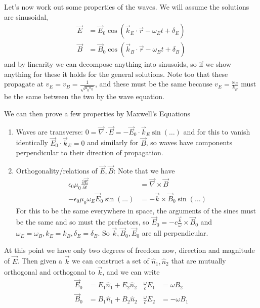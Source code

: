 \documentclass[10pt]{report}
\newcommand{\pd}[2]{\frac{\partial #1}{\partial#2}}
\begin{document}
Let's now work out some properties of the waves. We will assume the solutions are sinusoidal, 
\begin{align}
    \vec{E} &= \vec{E}_0 \cos\left( \vec{k}_E \cdot \vec{r} - \omega_Et + \delta_E \right)\\
    \vec{B} &= \vec{B}_0 \cos\left( \vec{k}_B \cdot \vec{r} - \omega_Bt + \delta_B \right)
\end{align}
and by linearity we can decompose anything into sinusoids, so if we show anything for these it holds for the general solutions. Note too that these propagate at $v_E = v_B = \frac{1}{\sqrt{\mu_0 \epsilon_0}}$, and these must be the same because $v_E = \frac{\omega_E}{k_E}$ must be the same between the two by the wave equation. 

We can then prove a few properties by Maxwell's Equations
\begin{enumerate}
    \item Waves are transverse: $0 = \vec{\nabla} \cdot \vec{E} = -\vec{E}_0 \cdot \vec{k}_E \sin (\dots)$ and for this to vanish identically $\vec{E}_0 \cdot \vec{k}_E = 0$ and similarly for $\vec{B}$, so waves have components perpendicular to their direction of propagation.
    \item Orthogonality/relations of $\vec{E}, \vec{B}$: Note that we have
        \begin{align}
            \epsilon_0 \mu_0 \pd{\vec{E}}{t} &= \vec{\nabla} \times \vec{B}\\
            -\epsilon_0 \mu_0 \omega_E \vec{E}_0 \sin \left( \dots \right) &= -\vec{k}\times \vec{B}_0 \sin(\dots)
        \end{align}
        For this to be the same everywhere in space, the arguments of the sines must be the same and so must the prefactors, so $\vec{E}_0 = -c \frac{\vec{k}}{\omega} \times \vec{B}_0$ and $\omega_E = \omega_B, k_E = k_B, \delta_E = \delta_B$. So $\vec{k}, \vec{B}_0, \vec{E}_0$ are all perpendicular.
\end{enumerate}

At this point we have only two degrees of freedom now, direction and magnitude of $\vec{E}$. Then given a $\vec{k}$ we can construct a set of $\hat{n}_1, \hat{n}_2$ that are mutually orthogonal and orthogonal to $\vec{k}$, and we can write
\begin{align}
    \vec{E}_0 &= E_1\hat{n}_1 + E_2\hat{n}_2 & \frac{\omega}{c}E_1 &= \omega B_2\\
    \vec{B}_0 &= B_1\hat{n}_1 + B_2\hat{n}_2 & \frac{\omega}{c}E_2 &= -\omega B_1
\end{align}
\end{document}
